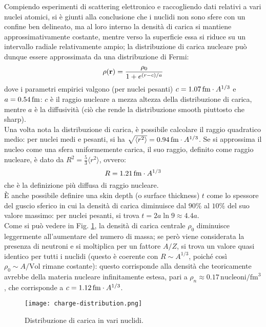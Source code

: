 Compiendo esperimenti di scattering elettronico e raccogliendo dati relativi a vari nuclei atomici, si è giunti alla conclusione che i nuclidi non sono sfere con un confine ben delineato, ma al loro interno la densità di carica si mantiene approssimativamente costante, mentre verso la superficie essa si riduce su un intervallo radiale relativamente ampio; la distribuzione di carica nucleare può dunque essere approssimata da una distribuzione di Fermi:
\begin{equation}
	\rho(\mathbf{r}) = \frac{\rho_0}{1 + e^{(r - c) / a}}
	\label{eq:14}
\end{equation}
dove i parametri empirici valgono (per nuclei pesanti) $ c = 1.07\,\mathrm{fm} \cdot A^{1/3} $ e $ a = 0.54\,\mathrm{fm} $: $ c $ è il raggio nucleare a mezza altezza della distribuzione di carica, mentre $ a $ è la diffusività (ciò che rende la distribuzione smooth piuttosto che sharp).\\
Una volta nota la distribuzione di carica, è possibile calcolare il raggio quadratico medio: per nuclei medi e pesanti, si ha $ \sqrt{\langle r^2 \rangle} = 0.94\,\mathrm{fm} \cdot A^{1/3} $. Se si approssima il nucleo come una sfera uniformemente carica, il suo raggio, definito come raggio nucleare, è dato da $ R^2 = \frac{5}{3} \langle r^2 \rangle $, ovvero:
\begin{equation}
	R = 1.21\,\mathrm{fm} \cdot A^{1/3}
	\label{eq:14-bis}
\end{equation}
che è la definizione più diffusa di raggio nucleare.\\
È anche possibile definire una skin depth (o surface thickness) $ t $ come lo spessore del guscio sferico in cui la densità di carica diminuisce dal $ 90\% $ al $ 10\% $ del suo valore massimo: per nuclei pesanti, si trova $ t = 2a\ln9 \approx 4.4 a $.\\
Come si può vedere in Fig. \ref{charge-distr}, la densità di carica centrale $ \rho_0 $ diminuisce leggermente all'aumentare del numero di massa; se però viene considerata la presenza di neutroni e si moltiplica per un fattore $ A / Z $, si trova un valore quasi identico per tutti i nuclidi (questo è coerente con $ R \sim A^{1/3} $, poiché così $ \rho_0 \sim A / \text{Vol} $ rimane costante): questo corrisponde alla densità che teoricamente avrebbe della materia nucleare infinitamente estesa, pari a $ \rho_n \approx 0.17 \,\text{nucleoni} / \text{fm}^3 $, che corrisponde a $ c = 1.12\,\mathrm{fm} \cdot A^{1/3} $.
\begin{figure}[!ht]
	\centering
	\texttt{[image: charge-distribution.png]}
	\caption{Distribuzione di carica in vari nuclidi.}
	\label{charge-distr}
\end{figure}

